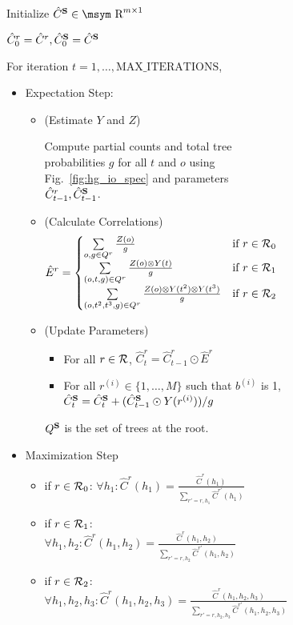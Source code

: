 \documentclass[11pt]{article}
\newcommand{\rione}{r^{(i)}}
\newcommand{\rules}{{\cal R}}
\newcommand{\e}[1]{\hat{#1}}
\newcommand{\bS}{{\bf S}}
\newcommand{\reals}{\mbox{\msym R}}
\begin{document}
\begin{figure*}[t!]
{\begin{footnotesize}
\begin{subfigure}{1.05\columnwidth}
	Initialize $\e{C}^\bS \in \reals^{m \times 1}$ 
	
	$\e{C}_0^r = \e{C}^r, \e{C}_0^\bS = \e{C}^\bS$
	
	For iteration $t=1, \dots, \textrm{MAX\_ITERATIONS}$, 
	\begin{itemize}			
		\item Expectation Step: 
		 \begin{itemize}[label={}]
			\item (Estimate $Y$ and $Z$) 
			
			Compute partial counts and total tree probabilities $g$ for all $t$ and $o$ using Fig.~\ref{fig:hg_io_spec} and parameters $\e{C}_{t-1}^r, \e{C}_{t-1}^\bS$.  
			\item (Calculate Correlations) 
				\begin{align*}
					\e{E}^r &= \begin{cases}
					\sum\limits_{o, g \in Q^r} \frac{Z(o)}{g} &\textrm{if }r \in \rules_0 \\
					\sum\limits_{\left(o, t, g\right) \in Q^r} \frac{Z(o) \otimes Y(t)}{g} &\textrm{if }r \in \rules_1 \\
					\sum\limits_{\left(o,t^2,t^3,g\right) \in Q^r} \frac{Z(o) \otimes Y(t^2) \otimes Y(t^3)}{g} &\textrm{if }r \in \rules_2 
					\end{cases}
				\end{align*}
			\item (Update Parameters)
		 	\begin{itemize}[label={}]
		 		\item For all $r \in \rules$, $\e{C}^r_t = \e{C}^r_{t-1} \odot \e{E}^r$
		 		\item For all $\rione \in \{1, \dots, M\}$ such that $b^{(i)}$ is 1, $\e{C}^\bS_t = \e{C}^\bS_t + (\e{C}^\bS_{t-1} \odot Y(\rione)) / g $
		 	\end{itemize}
		 	$Q^\bS$ is the set of trees at the root.
		\end{itemize}
		\item Maximization Step
			\begin{itemize}[label={},nolistsep]%
				\item if $r \in \rules_0$: $\forall h_1: \e{C}^r(h_1) = \frac{\e{C}^r(h_1)}{\sum_{r'=r, h_1}\e{C}^{r'}(h_1)}$ 
				\item if $r \in \rules_1$: $\forall h_1, h_2: \e{C}^r(h_1, h_2) = \frac{\e{C}^r(h_1, h_2)}{\sum_{r'=r, h_2}\e{C}^{r'}(h_1, h_2)}$ 
				\item if $r \in \rules_2$: $\forall h_1, h_2, h_3: \e{C}^r(h_1, h_2, h_3) = \frac{\e{C}^r(h_1, h_2, h_3)}{\sum_{r'=r,h_2, h_3}\e{C}^{r'}(h_1, h_2, h_3)}$ 

\end{itemize}
\end{itemize}
\end{subfigure}
\end{footnotesize}}
\end{figure*}
\end{document}
